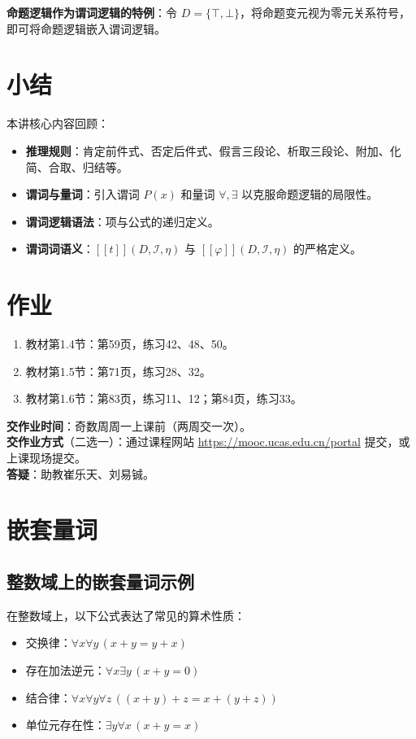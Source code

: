 \documentclass[UTF8,11pt,a4paper]{ctexbook}   %
\theoremstyle{definition}
\begin{document}
\textbf{命题逻辑作为谓词逻辑的特例}：令 $D=\{\top,\bot\}$，将命题变元视为零元关系符号，即可将命题逻辑嵌入谓词逻辑。

\section{小结}

本讲核心内容回顾：
\begin{itemize}
    \item \textbf{推理规则}：肯定前件式、否定后件式、假言三段论、析取三段论、附加、化简、合取、归结等。
    \item \textbf{谓词与量词}：引入谓词 $P(x)$ 和量词 $\forall,\exists$ 以克服命题逻辑的局限性。
    \item \textbf{谓词逻辑语法}：项与公式的递归定义。
    \item \textbf{谓词词语义}：$[\![t]\!](D,\mathcal{I},\eta)$ 与 $[\![\varphi]\!](D,\mathcal{I},\eta)$ 的严格定义。
\end{itemize}

\section{作业}

\begin{enumerate}
    \item 教材第1.4节：第59页，练习42、48、50。
    \item 教材第1.5节：第71页，练习28、32。
    \item 教材第1.6节：第83页，练习11、12；第84页，练习33。
\end{enumerate}

\textbf{交作业时间}：奇数周周一上课前（两周交一次）。\\
\textbf{交作业方式}（二选一）：通过课程网站 \url{https://mooc.ucas.edu.cn/portal} 提交，或上课现场提交。\\
\textbf{答疑}：助教崔乐天、刘易铖。

\section{嵌套量词}

\subsection{整数域上的嵌套量词示例}

在整数域上，以下公式表达了常见的算术性质：
\begin{itemize}
    \item 交换律：$\forall x\forall y\,(x+y=y+x)$
    \item 存在加法逆元：$\forall x\exists y\,(x+y=0)$
    \item 结合律：$\forall x\forall y\forall z\,((x+y)+z=x+(y+z))$
    \item 单位元存在性：$\exists y\forall x\,(x+y=x)$
\end{itemize}
\end{document}
